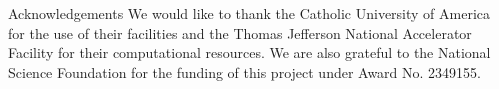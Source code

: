 \documentclass[final]{beamer}
\newlength{\sepwidth}
\newlength{\colwidth}
\newcommand{\separatorcolumn}{\begin{column}{\sepwidth}\end{column}}
\begin{document}
\begin{frame}[t]
\begin{columns}[t]
\begin{column}{\colwidth}
\vspace{-1.25cm}
  \begin{block}{Acknowledgements}
\small We would like to thank the Catholic University of America for the use of their facilities and the Thomas Jefferson National Accelerator Facility for their computational resources. We are also grateful to the National Science Foundation for the funding of this project under Award No. 2349155. 

  \end{block}

\end{column}

\separatorcolumn
\end{columns}
\end{frame}
\end{document}
